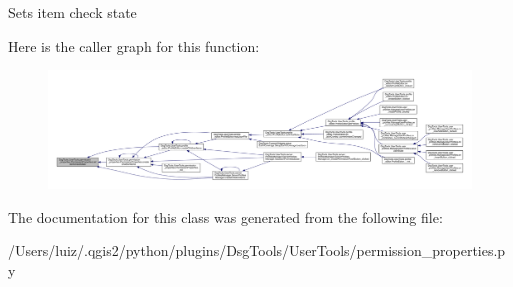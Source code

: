 \begin{DoxyVerb}Sets item check state
\end{DoxyVerb}
 Here is the caller graph for this function\+:
\nopagebreak
\begin{figure}[H]
\begin{center}
\leavevmode
\includegraphics[width=350pt]{class_dsg_tools_1_1_user_tools_1_1permission__properties_1_1_permission_properties_af518c4af5cbbd1ebe029ba00dd896659_icgraph}
\end{center}
\end{figure}


The documentation for this class was generated from the following file\+:\begin{DoxyCompactItemize}
\item 
/\+Users/luiz/.\+qgis2/python/plugins/\+Dsg\+Tools/\+User\+Tools/permission\+\_\+properties.\+py\end{DoxyCompactItemize}
